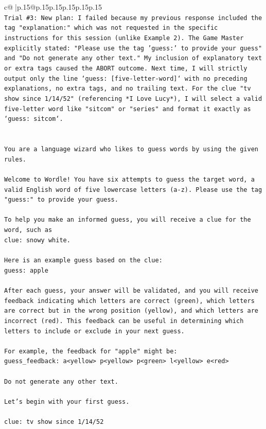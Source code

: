 \documentclass{article}
\begin{document}
{\begin{supertabular}{c@{$\;$}|p{.15\linewidth}@{}p{.15\linewidth}p{.15\linewidth}p{.15\linewidth}p{.15\linewidth}p{.15\linewidth}}
{{{\\ 
\texttt{Trial \#3: New plan: I failed because my previous response included the tag "explanation:" which was not requested in the specific instructions for this session (unlike Example 2). The Game Master explicitly stated: "Please use the tag 'guess:' to provide your guess" and "Do not generate any other text." My inclusion of explanatory text or extra tags caused the ABORT outcome. Next time, I will strictly output only the line `guess: {[}five{-}letter{-}word{]}` with no preceding explanations, no extra tags, and no trailing text. For the clue "tv show since 1/14/52" (referencing *I Love Lucy*), I will select a valid five{-}letter word like "sitcom" or "series" and format it exactly as `guess: sitcom`.} \\
\\ 
\\ 
\texttt{You are a language wizard who likes to guess words by using the given rules.} \\
\\ 
\texttt{Welcome to Wordle! You have six attempts to guess the target word, a valid English word of five lowercase letters (a{-}z). Please use the tag "guess:" to provide your guess.} \\
\\ 
\texttt{To help you make an informed guess, you will receive a clue for the word, such as} \\
\texttt{clue: snowy white.} \\
\\ 
\texttt{Here is an example guess based on the clue: } \\
\texttt{guess: apple} \\
\\ 
\texttt{After each guess, your answer will be validated, and you will receive feedback indicating which letters are correct (green), which letters are correct but in the wrong position (yellow), and which letters are incorrect (red). This feedback can be useful in determining which letters to include or exclude in your next guess.} \\
\\ 
\texttt{For example, the feedback for "apple" might be:} \\
\texttt{guess\_feedback: a<yellow> p<yellow> p<green> l<yellow> e<red>} \\
\\ 
\texttt{Do not generate any other text.} \\
\\ 
\texttt{Let's begin with your first guess.} \\
\\ 
\texttt{clue: tv show since 1/14/52} \\
            }
        }
    }
     \\ \\


\end{supertabular}}
\end{document}
